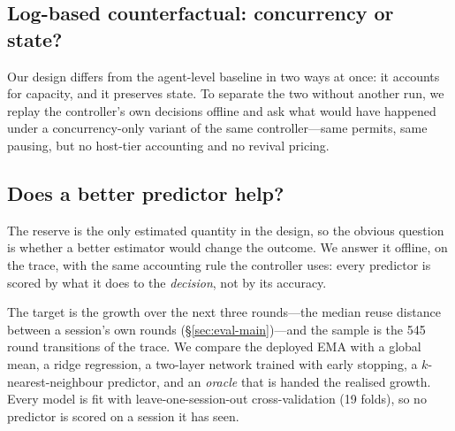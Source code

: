 
\subsection{Log-based counterfactual: concurrency or state?}
\label{sec:eval-cf}

Our design differs from the agent-level baseline in two ways at once: it accounts for
capacity, and it preserves state. To separate the two without another run, we replay the
controller's own decisions offline and ask what would have happened under a concurrency-only
variant of the same controller---same permits, same pausing, but no host-tier accounting
and no revival pricing.


\subsection{Does a better predictor help?}
\label{sec:eval-predictor}

The reserve is the only estimated quantity in the design, so the obvious question is
whether a better estimator would change the outcome. We answer it offline, on the trace,
with the same accounting rule the controller uses: every predictor is scored by what it
does to the \emph{decision}, not by its accuracy.

The target is the growth over the next three rounds---the median reuse distance between a
session's own rounds (\S\ref{sec:eval-main})---and the sample is the 545 round transitions
of the trace. We compare the deployed EMA with a global mean, a ridge regression, a
two-layer network trained with early stopping, a $k$-nearest-neighbour predictor, and an
\emph{oracle} that is handed the realised growth. Every model is fit with
leave-one-session-out cross-validation (19 folds), so no predictor is scored on a session
it has seen.


